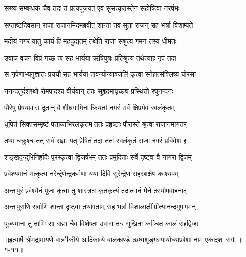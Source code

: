 \twolineshloka
{सख्यं सम्बन्धकं चैव तदा तं प्रत्यपूजयत्}
{एवं सुसत्कृतस्तेन सहोषित्वा नरर्षभः} %

\twolineshloka
{सप्ताष्टदिवसान् राजा राजानमिदमब्रवीत्}
{शान्ता तव सुता राजन् सह भर्त्रा विशाम्पते} %

\twolineshloka
{मदीयं नगरं यातु कार्यं हि महदुद्यतम्}
{तथेति राजा संश्रुत्य गमनं तस्य धीमतः} %

\twolineshloka
{उवाच वचनं विप्रं गच्छ त्वं सह भार्यया}
{ऋषिपुत्रः प्रतिश्रुत्य तथेत्याह नृपं तदा} %

\twolineshloka
{स नृपेणाभ्यनुज्ञातः प्रययौ सह भार्यया}
{तावन्योन्याञ्जलिं कृत्वा स्नेहात्संश्लिष्य चोरसा} %

\twolineshloka
{ननन्दतुर्दशरथो रोमपादश्च वीर्यवान्}
{ततः सुहृदमापृच्छ्य प्रस्थितो रघुनन्दनः} %

\twolineshloka
{पौरेषु प्रेषयामास दूतान् वै शीघ्रगामिनः}
{क्रियतां नगरं सर्वं क्षिप्रमेव स्वलंकृतम्} %

\twolineshloka
{धूपितं सिक्तसम्मृष्टं पताकाभिरलंकृतम्}
{ततः प्रहृष्टाः पौरास्ते श्रुत्वा राजानमागतम्} %

\twolineshloka
{तथा चक्रुश्च तत् सर्वं राज्ञा यत् प्रेषितं तदा}
{ततः स्वलंकृतं राजा नगरं प्रविवेश ह} %

\twolineshloka
{शङ्खदुन्दुभिनिर्ह्रादैः पुरस्कृत्वा द्विजर्षभम्}
{ततः प्रमुदिताः सर्वे दृष्ट्वा वै नागरा द्विजम्} %

\twolineshloka
{प्रवेश्यमानं सत्कृत्य नरेन्द्रेणेन्द्रकर्मणा}
{यथा दिवि सुरेन्द्रेण सहस्राक्षेण काश्यपम्} %

\twolineshloka
{अन्तःपुरं प्रवेश्यैनं पूजां कृत्वा तु शास्त्रतः}
{कृतकृत्यं तदात्मानं मेने तस्योपवाहनात्} %

\twolineshloka
{अन्तःपुराणि सर्वाणि शान्तां दृष्ट्वा तथागताम्}
{सह भर्त्रा विशालाक्षीं प्रीत्यानन्दमुपागमन्} %

\twolineshloka
{पूज्यमाना तु ताभिः सा राज्ञा चैव विशेषतः}
{उवास तत्र सुखिता कञ्चित् कालं सहद्विजा} %


॥इत्यार्षे श्रीमद्रामायणे वाल्मीकीये आदिकाव्ये बालकाण्डे ऋष्यशृङ्गस्यायोध्याप्रवेशः नाम एकादशः सर्गः ॥१-११॥
